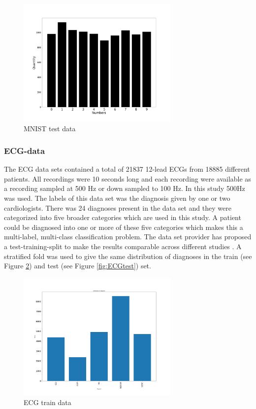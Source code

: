 \documentclass[twocolumn]{cinc}
\begin{document}
\begin{figure}[!htbp]
\includegraphics[width=7.9cm]{Figures/MNIST_test_data.png}
\caption{MNIST test data}
\label{fig:MNISTtest}
\end{figure}


\subsubsection{ECG-data}
The ECG data sets contained a total of 21837 12-lead ECGs from 18885 different patients. All recordings were 10 seconds long and each recording were available as a recording sampled at 500 Hz or down sampled to 100 Hz. In this study 500Hz was used. The labels of this data set was the diagnosis given by one or two cardiologists. There was 24 diagnoses present in the data set and they were categorized into five broader categories which are used in this study. A patient could be diagnosed into one or more of these five categories which makes this a multi-label, multi-class classification problem. The data set provider has proposed a test-training-split to make the results comparable across different studies \cite{wagner_ptb-xl_2020}. A stratified fold was used to give the same distribution of diagnoses in the train (see Figure \ref{fig:ECGtrain}) and test (see Figure \ref{fig:ECGtest}) set.

\begin{figure}[!htb]
\includegraphics[width=7.9cm]{Figures/distribution_training.png}
\caption{ECG train data}
\label{fig:ECGtrain}
\end{figure}
\end{document}
